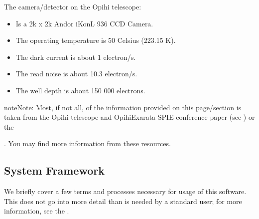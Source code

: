 \documentclass[letterpaper,11pt,english]{sphinxmanual}
\begin{document}
\sphinxAtStartPar
The camera/detector on the Opihi telescope:
\begin{itemize}
\item {} 
\sphinxAtStartPar
Is a 2k x 2k Andor iKon\sphinxhyphen{}L 936 CCD Camera.

\item {} 
\sphinxAtStartPar
The operating temperature is \sphinxhyphen{}50 Celsius (223.15 K).

\item {} 
\sphinxAtStartPar
The dark current is about 1 electron/s.

\item {} 
\sphinxAtStartPar
The read noise is about 10.3 electron/s.

\item {} 
\sphinxAtStartPar
The well depth is about 150 000 electrons.

\end{itemize}

\begin{sphinxadmonition}{note}{Note:}
\sphinxAtStartPar
Most, if not all, of the information provided on this page/section is
taken from the Opihi telescope and OpihiExarata SPIE conference paper (see
{\hyperref[\detokenize{user/citations:user-citations}]{}}) or the %
\begin{footnote}[3]\sphinxAtStartFootnote
{}
%
\end{footnote}. You may find more
information from these resources.
\end{sphinxadmonition}

\sphinxstepscope


\subsection{System Framework}
\label{\detokenize{user/system_framework:system-framework}}\label{\detokenize{user/system_framework:user-system-framework}}\label{\detokenize{user/system_framework::doc}}
\sphinxAtStartPar
We briefly cover a few terms and processes necessary for usage of this software.
This does not go into more detail than is needed by a standard user; for more
information, see the {\hyperref[\detokenize{technical/index:technical-index}]{}}.
\end{document}
